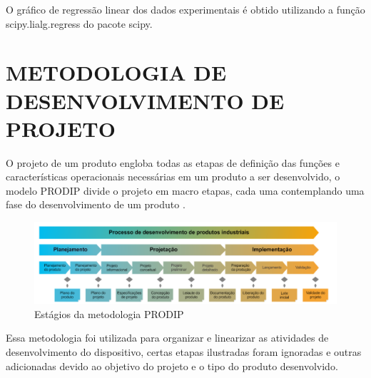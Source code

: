 O gráfico de regressão linear dos dados experimentais é obtido utilizando a função scipy.lialg.regress do pacote scipy.

\section{METODOLOGIA DE DESENVOLVIMENTO DE PROJETO}

O projeto de um produto engloba todas as etapas de definição das funções e características operacionais necessárias em um produto a ser desenvolvido, o modelo PRODIP divide o projeto em macro etapas, cada uma contemplando uma fase do desenvolvimento de um produto \autocite{PRODIP}.

\begin{figure}[htb]
	\caption{\label{fig:1170} Estágios da metodologia PRODIP}
	\begin{center}
		\includegraphics[width=\textwidth]{pictures/1170.png}
	\end{center}
\end{figure}

Essa metodologia foi utilizada para organizar e linearizar as atividades de desenvolvimento do dispositivo, certas etapas ilustradas foram ignoradas e outras adicionadas devido ao objetivo do projeto e o tipo do produto desenvolvido.






